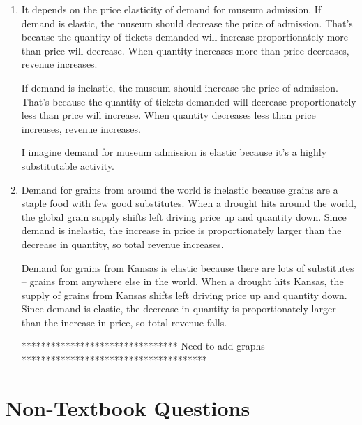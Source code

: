 \documentclass{article}
\begin{document}
\begin{enumerate}
\begin{enumerate}
	\item The policy will have a larger effect five years from now. In the long run, demand will be more elastic, so quantity demanded will decrease more in response to the price increase. 
	
	\item Teenager smokers might have developed less of a nicotine addiction than adult smokers. As a result, they might treat cigarettes as more of a luxury good while adult smokers might treat them as more of a necessity.
	
	\end{enumerate}
	
\item It depends on the price elasticity of demand for museum admission. If demand is elastic, the museum should decrease the price of admission. That's because the quantity of tickets demanded will increase proportionately more than price will decrease. When quantity increases more than price decreases, revenue increases.

If demand is inelastic, the museum should increase the price of admission. That's because the quantity of tickets demanded will decrease proportionately less than price will increase. When quantity decreases less than price increases, revenue increases.

I imagine demand for museum admission is elastic because it's a highly substitutable activity.

\item Demand for grains from around the world is inelastic because grains are a staple food with few good substitutes. When a drought hits around the world, the global grain supply shifts left driving price up and quantity down. Since demand is inelastic, the increase in price is proportionately larger than the decrease in quantity, so total revenue increases.

Demand for grains from Kansas is elastic because there are lots of substitutes -- grains from anywhere else in the world. When a drought hits Kansas, the supply of grains from Kansas shifts left driving price up and quantity down. Since demand is elastic, the decrease in quantity is proportionately larger than the increase in price, so total revenue falls.

******************************** Need to add graphs **************************************

\end{enumerate}

\section*{Non-Textbook Questions}
\end{document}
